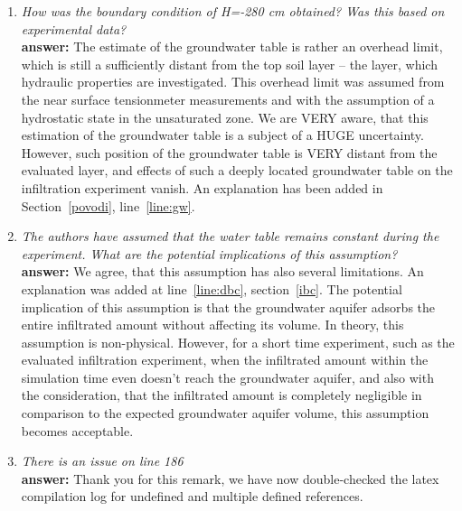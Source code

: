 \documentclass[final,3p]{elsarticle}
\begin{document}
\begin{enumerate}
\item {\it How was the boundary condition of H=-280 cm obtained? Was this based on experimental data?} \\
{\bf  answer:} The estimate of the groundwater table is rather an overhead limit, which is still a sufficiently distant from the top soil layer -- the layer, which hydraulic properties are investigated. This overhead limit was assumed from the near surface tensionmeter measurements and with the assumption of a hydrostatic state in the unsaturated zone. We are VERY aware, that this estimation of the groundwater table is a subject of a HUGE uncertainty. However, such position of the groundwater table is VERY distant from the evaluated layer, and effects of such a deeply located  groundwater table on the infiltration experiment vanish. An explanation has been added in Section~\ref{povodi}, line~\ref{line:gw}.
\item {\it   The authors have assumed that the water table remains constant during the experiment. What are the potential implications of this assumption?} \\
{\bf  answer:} We agree, that this assumption has also several limitations. An explanation was added at line~\ref{line:dbc}, section~\ref{ibc}. The potential implication of this assumption is that the groundwater aquifer adsorbs the entire infiltrated amount without affecting its volume. In theory, this assumption is non-physical. However, for a short time experiment, such as the evaluated infiltration experiment, when the infiltrated amount within the simulation time even doesn't reach the groundwater aquifer, and also with the consideration, that the infiltrated amount is completely negligible in comparison to the expected groundwater aquifer volume, this assumption becomes acceptable. 

\item {\it There is an issue on line 186} \\
{\bf  answer:} Thank you for this remark, we have now double-checked the latex compilation log for undefined and multiple defined references.


\end{enumerate}
\end{document}
